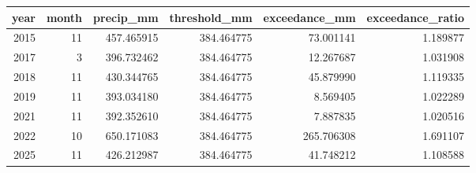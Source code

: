\begin{tabular}{rrrrrr}
\toprule
year & month & precip\_mm & threshold\_mm & exceedance\_mm & exceedance\_ratio \\
\midrule
2015 & 11 & 457.465915 & 384.464775 & 73.001141 & 1.189877 \\
2017 & 3 & 396.732462 & 384.464775 & 12.267687 & 1.031908 \\
2018 & 11 & 430.344765 & 384.464775 & 45.879990 & 1.119335 \\
2019 & 11 & 393.034180 & 384.464775 & 8.569405 & 1.022289 \\
2021 & 11 & 392.352610 & 384.464775 & 7.887835 & 1.020516 \\
2022 & 10 & 650.171083 & 384.464775 & 265.706308 & 1.691107 \\
2025 & 11 & 426.212987 & 384.464775 & 41.748212 & 1.108588 \\
\bottomrule
\end{tabular}
